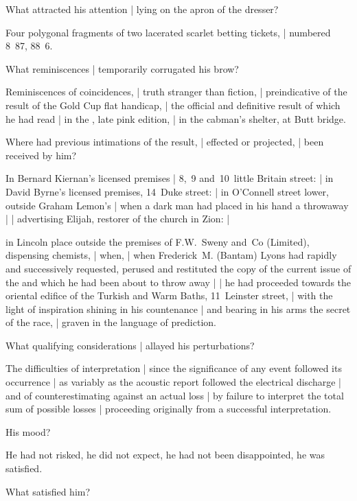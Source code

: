 What attracted his attention |
lying on the apron of the dresser?

\Science
Four polygonal fragments of two lacerated scarlet betting tickets, |
numbered 8~87, 88~6.


What reminiscences |
temporarily corrugated his brow?

\Memories
Reminiscences of coincidences, |
truth stranger than fiction, |
preindicative of the result of the Gold Cup flat handicap, |
the official and definitive result of which he had read |
in the ,
late pink edition, |
in the cabman's shelter, at Butt bridge.


Where had previous intimations of the result, |
effected or projected, |
been received by him?

\Memories
In Bernard Kiernan's licensed premises |
8,~9 and~10~little Britain street: |
in David Byrne's licensed premises, 14~Duke street: |
in O'Connell street lower, outside Graham Lemon's |
when a dark man had placed in his hand a throwaway |
 |
advertising Elijah, restorer of the church in Zion: |

\Places
in Lincoln place
outside the premises of F.W.~Sweny and~Co (Limited), dispensing chemists, |
when, |
when Frederick~M. (Bantam) Lyons
had rapidly and successively requested, perused and restituted
the copy of the current issue of the  and 
which he had been about to throw away |
 |
he had proceeded towards the oriental edifice of the Turkish and Warm Baths,
11~Leinster street, |
with the light of inspiration shining in his countenance |
and bearing in his arms the secret of the race, |
graven in the language of prediction.

What qualifying considerations |
allayed his perturbations?

\Science
The difficulties of interpretation |
since the significance of any event
followed its occurrence |
as variably as the acoustic report followed the electrical discharge |
and of counterestimating against an actual loss |
by failure to interpret the total sum of possible losses |
proceeding originally from a successful interpretation.


His mood?

\Bloom
He had not risked,
he did not expect,
he had not been disappointed,
he was satisfied.%


What satisfied him?


